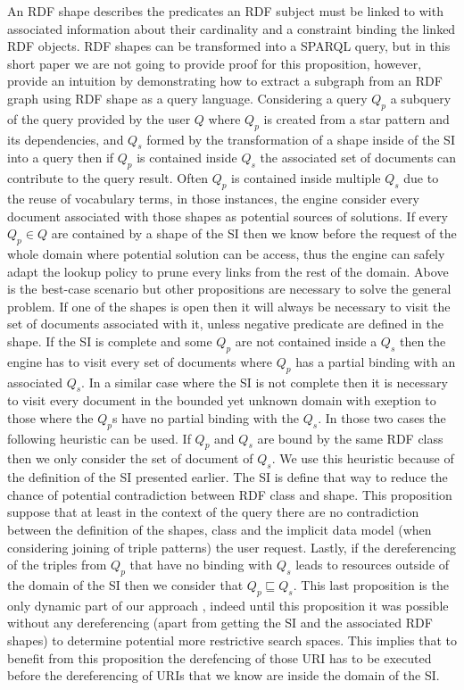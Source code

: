 An RDF shape describes the predicates an RDF subject must be linked to with associated information about
their cardinality and a constraint binding the linked RDF objects.
RDF shapes can be transformed into a SPARQL query, but
in this short paper we are not going to provide proof for this proposition, however,
\citeauthor{Delva2021} provide an intuition by demonstrating how to extract 
a subgraph from an RDF graph using RDF shape as a query language.
Considering a query $Q_p$ a subquery of the query provided by the user $Q$
where $Q_p$ is created from a star pattern and its dependencies, and $Q_s$ formed by the transformation of a shape inside of the SI
into a query then if  $Q_p$ is contained inside $Q_s$ the associated 
set of documents can contribute to the query result.
Often $Q_p$ is contained inside multiple $Q_s$ due to the reuse of vocabulary terms,
in those instances, the engine consider every document associated with those shapes
as potential sources of solutions.
If every $Q_p \in Q$ are contained by a shape of the SI then we know before the request of the whole domain
where potential solution can be access, thus the engine can safely adapt the lookup policy to prune every links from the rest of the domain.
Above is the best-case scenario but other propositions are necessary to solve the general problem.
If one of the shapes is open then it will always be necessary to visit the set of documents associated
with it, unless negative predicate are defined in the shape.
If the SI is complete and some $Q_p$ are not contained inside a $Q_s$ then the engine has to visit
every set of documents where $Q_p$ has a partial binding with an associated $Q_s$.
In a similar case where the SI is not complete then it is necessary to visit every document in the bounded yet unknown domain with exeption to those
where the $Q_p$s have no partial binding with the $Q_s$.
In those two cases the following heuristic can be used.
If $Q_p$ and $Q_s$ are bound by the same RDF class then we only consider the set of document of $Q_s$.
We use this heuristic because of the definition of the SI presented earlier.
The SI is define that way to reduce the chance of potential contradiction between RDF class and shape.
This proposition suppose that at least in the context of the query there are no contradiction between the
definition of the shapes, class and the implicit data model (when considering joining of triple patterns) the user request. 
Lastly, if the dereferencing of the triples from $Q_p$ that have no binding with $Q_s$
leads to resources outside of the domain of the SI then we consider that $Q_p  \sqsubseteq Q_s$.
This last proposition is the only dynamic part of our approach , indeed until this
proposition it was possible without any dereferencing (apart from getting the SI and the associated RDF shapes) to determine potential more restrictive search spaces.
This implies that to benefit from this proposition the derefencing of those URI has to be executed
before the dereferencing of URIs that we know are inside the domain of the SI.